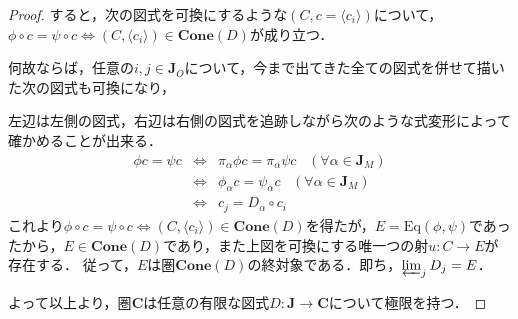 \documentclass[uplatex, 12pt, dvipdfmx]{jsarticle}
\begin{document}
\begin{proof}
    すると，次の図式を可換にするような$(C,c=\langle c_i\rangle)$について，$\phi\circ c=\psi\circ c\Leftrightarrow (C,\langle c_i\rangle)\in\mathbf{Cone}(D)$が成り立つ．
    \begin{center}
    \end{center}
    何故ならば，任意の$i,j\in\mathbf{J}_O$について，今まで出てきた全ての図式を併せて描いた次の図式も可換になり，
    \begin{center}
    \end{center}
    左辺は左側の図式，右辺は右側の図式を追跡しながら次のような式変形によって確かめることが出来る．
    \begin{eqnarray*}
        \phi c = \psi c &\Leftrightarrow& \pi_\alpha\phi c =\pi_\alpha\psi c \;\;\;(\forall\alpha\in\mathbf{J}_M ) \\
        &\Leftrightarrow& \phi_\alpha c =\psi_\alpha c \;\;\;(\forall\alpha\in\mathbf{J}_M ) \\
        &\Leftrightarrow& c_j = D_\alpha\circ c_i
    \end{eqnarray*}
    これより$\phi\circ c=\psi\circ c\Leftrightarrow (C,\langle c_i\rangle)\in\mathbf{Cone}(D)$を得たが，$E=\mathrm{Eq}(\phi,\psi)$であったから，$E\in\mathbf{Cone}(D)$であり，また上図を可換にする唯一つの射$u:C\to E$が存在する．
    従って，$E$は圏$\mathbf{Cone}(D)$の終対象である．即ち，$\varprojlim_{j}D_j=E$．

    よって以上より，圏$\mathbf{C}$は任意の有限な図式$D:\mathbf{J}\to\mathbf{C}$について極限を持つ．
\end{proof}
\end{document}
